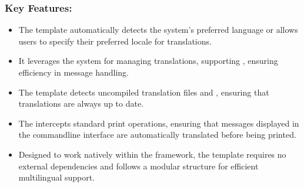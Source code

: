 \documentclass[letterpaper,10pt,english]{sphinxhowto}
\begin{document}
\subsubsection{Key Features:}
\label{\detokenize{templates/locales/index:key-features}}\begin{itemize}
\item {} 
\sphinxAtStartPar
{}
The template automatically detects the system’s preferred language or allows users to specify their preferred locale for translations.

\item {} 
\sphinxAtStartPar
{}
It leverages the  system for managing translations, supporting , ensuring efficiency in message handling.

\item {} 
\sphinxAtStartPar
{}
The template detects uncompiled translation files and , ensuring that translations are always up to date.

\item {} 
\sphinxAtStartPar
{}
The  intercepts standard print operations, ensuring that messages displayed in the command\sphinxhyphen{}line interface are automatically translated before being printed.

\item {} 
\sphinxAtStartPar
{}
Designed to work natively within the framework, the template requires no external dependencies and follows a modular structure for efficient multilingual support.

\end{itemize}
\end{document}
